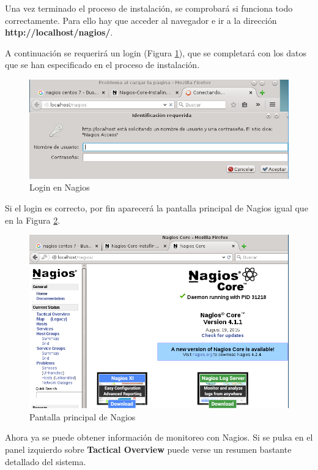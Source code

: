 \newpage

Una vez terminado el proceso de instalación, se comprobará si funciona todo correctamente. Para ello hay que acceder al navegador e ir a la dirección \textbf{http://localhost/nagios/}.

A continuación se requerirá un login (Figura \ref{fig:figura134}), que se completará con los datos que se han especificado en el proceso de instalación. 
\begin{figure}[H]
	\centering
	\includegraphics[scale=0.67]{figuras/ejercicio12/figura16.png} 
	\caption{Login en Nagios} 
	\label{fig:figura134}
\end{figure}

Si el login es correcto, por fin aparecerá la pantalla principal de Nagios igual que en la Figura \ref{fig:figura135}.

\begin{figure}[H]
	\centering
	\includegraphics[scale=0.6]{figuras/ejercicio12/figura17.png} 
	\caption{Pantalla principal de Nagios} 
	\label{fig:figura135}
\end{figure}

Ahora ya se puede obtener información de monitoreo con Nagios. Si se pulsa en el panel izquierdo sobre \textbf{Tactical Overview} puede verse
un resumen bastante detallado del sistema.

